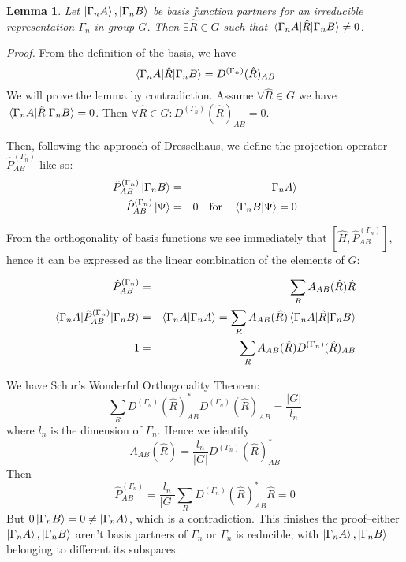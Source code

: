 \documentclass[12pt]{article}
\newtheorem{basis_mixing}
{Lemma}
\begin{document}
	\begin{basis_mixing}
	Let $\ket{\Gamma_nA}, \ket{\Gamma_nB}$ be basis function partners for an irreducible representation $\Gamma_n$ in group $G$. Then $\exists \hat{R}\in G$ such that $\mel{\Gamma_nA}{\hat{R}}{\Gamma_nB}\neq 0$.
	\end{basis_mixing}
	
	\textit{Proof.} From the definition of the basis, we have
	$$\mel{\Gamma_nA}{\hat{R}}{\Gamma_nB} = D^{\left(\Gamma_n\right)}(\hat{R})_{AB}$$
	We will prove the lemma by contradiction. Assume $\forall \hat{R}\in G$ we have $\mel{\Gamma_nA}{\hat{R}}{\Gamma_nB}=0$. Then $\forall \hat{R}\in G: D^{\left(\Gamma_n\right)}(\hat{R})_{AB}=0$.
	
	Then, following the approach of Dresselhaus, we define the projection operator $\hat{P}^{\left(\Gamma_n\right)}_{AB}$ like so:
	\begin{eqnarray*}		
	\hat{P}^{\left(\Gamma_n\right)}_{AB}\ket{\Gamma_nB}&=&\ket{\Gamma_nA}\\
	\hat{P}^{\left(\Gamma_n\right)}_{AB}\ket{\Psi}&=&0 \qq{for} \braket{\Gamma_n B}{\Psi}=0
	\end{eqnarray*}
	
	From the orthogonality of basis functions we see immediately that $[\hat{H},\hat{P}^{\left(\Gamma_n\right)}_{AB}]$, hence it can be expressed as the linear combination of the elements of $G$:
	
	\begin{eqnarray*}
	\hat{P}^{\left(\Gamma_n\right)}_{AB}&=&\sum_{R}A_{AB}(\hat{R})\hat{R}\\
	\mel{\Gamma_nA}{\hat{P}^{\left(\Gamma_n\right)}_{AB}}{\Gamma_nB}&=&\braket{\Gamma_nA}{\Gamma_nA}=\sum_{R}A_{AB}(\hat{R})\mel{\Gamma_nA}{\hat{R}}{\Gamma_nB}\\
	1&=&\sum_{R}A_{AB}(\hat{R})D^{\left(\Gamma_n\right)}(\hat{R})_{AB}
	\end{eqnarray*}
	
	We have Schur's Wonderful Orthogonality Theorem:
	$$\sum_{R}D^{\left(\Gamma_n\right)}(\hat{R})_{AB}^* D^{\left(\Gamma_n\right)}(\hat{R})_{AB} = \frac{|G|}{l_n}$$
	where $l_n$ is the dimension of $\Gamma_n$. Hence we identify
	$$A_{AB}(\hat{R})=\frac{l_n}{|G|}D^{\left(\Gamma_n\right)}(\hat{R})_{AB}^*$$
	Then
	$$\hat{P}^{\left(\Gamma_n\right)}_{AB}=\frac{l_n}{|G|}\sum_{R}D^{\left(\Gamma_n\right)}(\hat{R})_{AB}^*\hat{R}=0$$
	But $0\ket{\Gamma_nB}=0\neq\ket{\Gamma_nA}$, which is a contradiction. This finishes the proof--either $\ket{\Gamma_nA},\ket{\Gamma_nB}$ aren't basis partners of $\Gamma_n$ or $\Gamma_n$ is reducible, with $\ket{\Gamma_nA},\ket{\Gamma_nB}$ belonging to different its subspaces.
	
	
\end{document}

